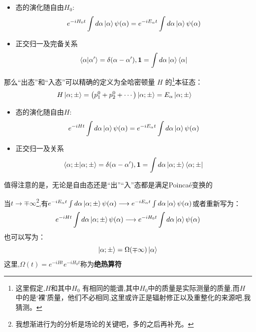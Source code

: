     \begin{itemize}
    \item 态的演化随自由$H_0$:
        \begin{equation}
            e^{-iH_0t}\int d\alpha \ket{\alpha}\psi(\alpha)=e^{-iE_\alpha t}\int d\alpha \ket{\alpha}\psi(\alpha)
        \end{equation}
    \item 正交归一及完备关系
            \begin{equation}
            \braket{\alpha|\alpha'} = \delta(\alpha-\alpha'),
            \mathbf{1} = \int d\alpha \ket{\alpha}\bra{\alpha}
        \end{equation}
        \end{itemize}
    \color{blue}那么“出态”和“入态”可以精确的定义为全哈密顿量 $H$ 的\footnote{这里假定,\(H\)和\(其中H_0\) 有相同的能谱,其中\(H_0\)中的质量是实际测量的质量,而\(H\)中的是‘裸’质量，他们不必相同,这里或许正是辐射修正以及重整化的来源吧,我猜测。}本征态：\normalcolor
        \begin{equation}
                 \begin{aligned}
                H \ket{\alpha;\pm}
                &=
                \left( p_1^0 + p_2^0 + \cdots \right)\ket{\alpha;\pm}
                = E_\alpha \ket{\alpha;\pm}
                \end{aligned}
        \end{equation}
    \begin{itemize}
        \item 态的演化随自由$H$:
        \begin{equation}
            e^{-iHt}\int d\alpha \ket{\alpha}\psi(\alpha)=e^{-iE_\alpha t}\int d\alpha \ket{\alpha}\psi(\alpha)
        \end{equation}
    \item 正交归一及关系
            \begin{equation}
                        \braket{\alpha;\pm|\alpha;\pm} = \delta(\alpha-\alpha'),
                        \mathbf{1} = \int d\alpha \ket{\alpha;\pm}\bra{\alpha;\pm}
            \end{equation}
    \end{itemize}
值得注意的是，无论是自由态还是“出”“入”态都是满足Poinca\'e变换的   
\begin{tcolorbox}[colback=white!5,colframe=black!45]
    当$t\rightarrow\mp\infty$\footnote{我想渐进行为的分析是场论的关键吧，多的之后再补充。},有$e^{-iE_\alpha t}\int d\alpha \ket{\alpha;\pm}\psi(\alpha)\longrightarrow e^{-iE_\alpha t}\int d\alpha \ket{\alpha}\psi(\alpha)$或者重新写为：
    \begin{equation}
        e^{-iH t}\int d\alpha \ket{\alpha;\pm}\psi(\alpha)\longrightarrow e^{-iH_0 t}\int d\alpha \ket{\alpha}\psi(\alpha)
    \end{equation}
    也可以写为：\begin{equation}
        \ket{\alpha;\pm}=\Omega(\mp\infty)\ket{\alpha}
    \end{equation}
        这里,$\Omega(t)=e^{-iH t}e^{-iH_0 t}$称为\textbf{绝热算符}
\end{tcolorbox}
